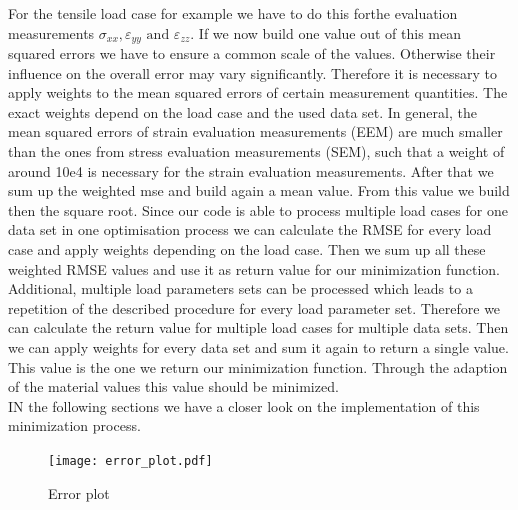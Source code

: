     
    For the tensile load case for example we have to do this forthe evaluation measurements $\sigma_{xx}, \varepsilon_{yy} \text{ and } \varepsilon_{zz}$. 
    If we now build one value out of this mean squared errors we have to ensure a common scale of the values. Otherwise their influence on the overall error may vary significantly. Therefore it is necessary to apply weights to the mean squared errors of certain measurement quantities. The exact weights depend on the load case and the used data set. In general, the mean squared errors of strain evaluation measurements (EEM) are much smaller than the ones from stress evaluation measurements (SEM), such that a weight of around 10e4 is necessary for the strain evaluation measurements. After that we sum up the weighted mse and build again a mean value. From this value we build then the square root. Since our code is able to process multiple load cases for one data set in one optimisation process we can calculate the RMSE for every load case and apply weights depending on the load case. Then we sum up all these weighted RMSE values and use it as return value for our minimization function. Additional, multiple load parameters sets can be processed which leads to a repetition of the described procedure for every load parameter set. Therefore we can calculate the return value for multiple load cases for multiple data sets. Then we can apply weights for every data set and sum it again to return a single value. This value is the one we return our minimization function. Through the adaption of the material values this value should be minimized. \\
    IN the following sections we have a closer look on the implementation of this minimization process. 

    \begin{figure}[H]
        \centering
        \texttt{[image: error\_plot.pdf]}
        \caption{Error plot}
        \label{fig: erroPlot}
    \end{figure}


